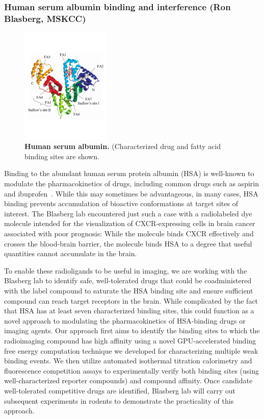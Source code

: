 \documentclass[10pt]{article}
\begin{document}
\subsubsection*{Human serum albumin binding and interference (Ron Blasberg, MSKCC)}

\begin{figure}
\vspace{-2cm}
\includegraphics[width=0.38\textwidth]{figures/hsa-binding-sites.pdf}
\vspace{-2cm}
\caption{\footnotesize \label{fig:hsa} {\bf Human serum albumin.}
(Characterized drug and fatty acid binding sites are shown.}
\end{figure}

Binding to the abundant human serum protein albumin (HSA) is well-known to modulate the pharmacokinetics of drugs, including common drugs such as aspirin and ibuprofen~\cite{fasano:iubmb-life:2005:hsa-review}.
While this may sometimes be advantageous, in many cases, HSA binding prevents accumulation of bioactive conformations at target sites of interest.
The Blasberg lab encountered just such a case with a radiolabeled dye molecule intended for the visualization of CXCR-expressing cells in brain cancer associated with poor prognosis: While the molecule binds CXCR effectively and crosses the blood-brain barrier, the molecule binds HSA to a degree that useful quantities cannot accumulate in the brain.

To enable these radioligands to be useful in imaging, we are working with the Blasberg lab to identify safe, well-tolerated drugs that could be coadministered with the label compound to saturate the HSA binding site and ensure sufficient compound can reach target receptors in the brain.
While complicated by the fact that HSA has at least seven characterized binding sites, this could function as a novel approach to modulating the pharmacokinetics of HSA-binding drugs or imaging agents.
Our approach first aims to identify the binding sites to which the radioimaging compound has high affinity using a novel GPU-accelerated binding free energy computation technique we developed for characterizing multiple weak binding events.
We then utilize automated isothermal titration calorimetry and fluorescence competition assays to experimentally verify both binding sites (using well-characterized reporter compounds) and compound affinity.
Once candidate well-tolerated competitive drugs are identified, Blasberg lab will carry out subsequent experiments in rodents to demonstrate the practicality of this approach.
\end{document}
